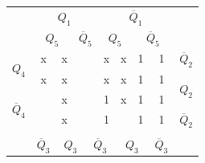 \documentclass[a4paper,14pt]{article}
\begin{document}
\begin{table}[H]
	\begin{minipage}{.5\linewidth}
		\centering
\begin{tabular}{cccccccccc}
	& \multicolumn{4}{c}{$Q_1$}                                                                       & \multicolumn{4}{c}{$\overline{Q}_1$}                                                              &                        \\
	& \multicolumn{2}{c}{$Q_5$}                       & \multicolumn{2}{c}{$\overline{Q}_5$}          & \multicolumn{2}{c}{$Q_5$}                       & \multicolumn{2}{c}{$\overline{Q}_5$}            &                        \\ \cline{2-9}
	\multicolumn{1}{c|}{\multirow{2}{*}{$Q_4$}}            & \multicolumn{1}{c|}{x} & \multicolumn{1}{c|}{x} & \multicolumn{1}{c|}{} & \multicolumn{1}{c|}{} & \multicolumn{1}{c|}{x} & \multicolumn{1}{c|}{x} & \multicolumn{1}{c|}{1} & \multicolumn{1}{c|}{1} & $\overline{Q}_2$       \\ \cline{2-9}
	\multicolumn{1}{c|}{}                                  & \multicolumn{1}{c|}{x} & \multicolumn{1}{c|}{x} & \multicolumn{1}{c|}{} & \multicolumn{1}{c|}{} & \multicolumn{1}{c|}{x} & \multicolumn{1}{c|}{x} & \multicolumn{1}{c|}{1} & \multicolumn{1}{c|}{1} & \multirow{2}{*}{$Q_2$} \\ \cline{2-9}
	\multicolumn{1}{c|}{\multirow{2}{*}{$\overline{Q}_4$}} & \multicolumn{1}{c|}{}  & \multicolumn{1}{c|}{x} & \multicolumn{1}{c|}{} & \multicolumn{1}{c|}{} & \multicolumn{1}{c|}{1} & \multicolumn{1}{c|}{x} & \multicolumn{1}{c|}{1} & \multicolumn{1}{c|}{1} &                        \\ \cline{2-9}
	\multicolumn{1}{c|}{}                                  & \multicolumn{1}{c|}{}  & \multicolumn{1}{c|}{x} & \multicolumn{1}{c|}{} & \multicolumn{1}{c|}{} & \multicolumn{1}{c|}{1} & \multicolumn{1}{c|}{}  & \multicolumn{1}{c|}{1} & \multicolumn{1}{c|}{1} & $\overline{Q}_2$       \\ \cline{2-9}
	&                        & \multicolumn{2}{c}{}                           & \multicolumn{2}{c}{}                           & \multicolumn{2}{c}{}                            &                        &                        \\
	& $\overline{Q}_3$       & \multicolumn{2}{c}{$Q_3$}                      & \multicolumn{2}{c}{$\overline{Q}_3$}           & \multicolumn{2}{c}{$Q_3$}                       & $\overline{Q}_3$       &                       

\end{tabular}
\end{minipage}
\end{table}
\end{document}
